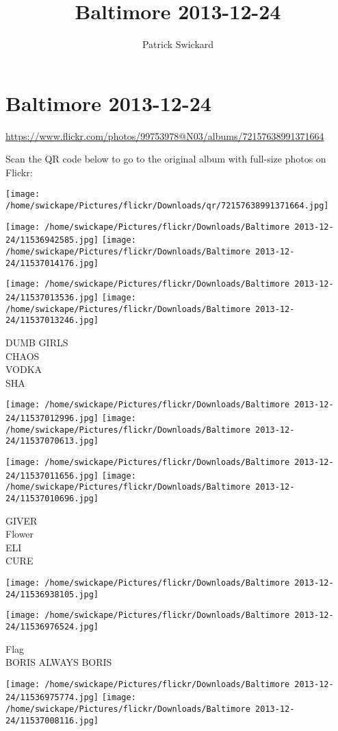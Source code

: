 \documentclass[10pt,letterpaper]{article}
\title{Baltimore 2013-12-24}
\author{Patrick Swickard}
\date{}
\begin{document}
\section*{Baltimore 2013-12-24}

\url{https://www.flickr.com/photos/99753978@N03/albums/72157638991371664}

Scan the QR code below to go to the original album with full-size photos on Flickr:

\texttt{[image: /home/swickape/Pictures/flickr/Downloads/qr/72157638991371664.jpg]}
\pagebreak

\texttt{[image: /home/swickape/Pictures/flickr/Downloads/Baltimore 2013-12-24/11536942585.jpg]}
\texttt{[image: /home/swickape/Pictures/flickr/Downloads/Baltimore 2013-12-24/11537014176.jpg]}

\texttt{[image: /home/swickape/Pictures/flickr/Downloads/Baltimore 2013-12-24/11537013536.jpg]}
\texttt{[image: /home/swickape/Pictures/flickr/Downloads/Baltimore 2013-12-24/11537013246.jpg]}

DUMB GIRLS\\
CHAOS\\
VODKA\\
SHA
\pagebreak

\texttt{[image: /home/swickape/Pictures/flickr/Downloads/Baltimore 2013-12-24/11537012996.jpg]}
\texttt{[image: /home/swickape/Pictures/flickr/Downloads/Baltimore 2013-12-24/11537070613.jpg]}

\texttt{[image: /home/swickape/Pictures/flickr/Downloads/Baltimore 2013-12-24/11537011656.jpg]}
\texttt{[image: /home/swickape/Pictures/flickr/Downloads/Baltimore 2013-12-24/11537010696.jpg]}

GIVER\\
Flower\\
ELI\\
CURE
\pagebreak

\texttt{[image: /home/swickape/Pictures/flickr/Downloads/Baltimore 2013-12-24/11536938105.jpg]}

\vspace{0.25in}
\texttt{[image: /home/swickape/Pictures/flickr/Downloads/Baltimore 2013-12-24/11536976524.jpg]}

Flag\\
BORIS ALWAYS BORIS
\pagebreak

\texttt{[image: /home/swickape/Pictures/flickr/Downloads/Baltimore 2013-12-24/11536975774.jpg]}
\texttt{[image: /home/swickape/Pictures/flickr/Downloads/Baltimore 2013-12-24/11537008116.jpg]}
\end{document}
